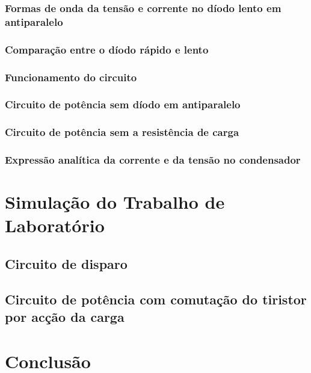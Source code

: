 \documentclass[a4paper,11pt]{article}
\numberwithin{equation}{section}
\begin{document}
\subsubsection{Formas de onda da tensão e corrente no díodo lento em antiparalelo}

\subsubsection{Comparação entre o díodo rápido e lento}

\subsubsection{Funcionamento do circuito}

\subsubsection{Circuito de potência sem díodo em antiparalelo}

\subsubsection{Circuito de potência sem a resistência de carga}

\subsubsection{Expressão analítica da corrente e da tensão no condensador}

\pagebreak

\section{Simulação do Trabalho de Laboratório}

\subsection{Circuito de disparo}

\subsection{Circuito de potência com comutação do tiristor por acção da carga}

\pagebreak

\section{Conclusão}
\end{document}
